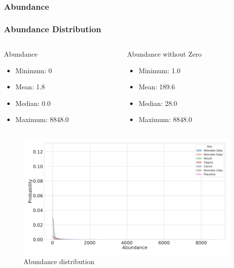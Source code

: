 \documentclass{beamer}
\begin{document}
    \subsubsection{Abundance}
    \begin{frame}
        \frametitle{Abundance Distribution}

        \begin{columns}
            \begin{column}{0.4 \linewidth}
                \begin{block}{Abundance}
                    \begin{itemize}
                        \item Minimum: 0
                        \item Mean: 1.8
                        \item Median: 0.0
                        \item Maximum: 8848.0
                    \end{itemize}
                \end{block}
            \end{column}

            \begin{column}{0.4 \linewidth}
                \begin{block}{Abundance without Zero}
                    \begin{itemize}
                        \item Minimum: 1.0
                        \item Mean: 189.6
                        \item Median: 28.0
                        \item Maximum: 8848.0
                    \end{itemize}
                \end{block}
            \end{column}
        \end{columns}

        \begin{figure}
            \includegraphics[width=0.5 \linewidth]{figures/Step53/everything.DADA2.homd.uncorrected.pdf}
            \caption{Abundance distribution}
        \end{figure}
    \end{frame}
\end{document}
